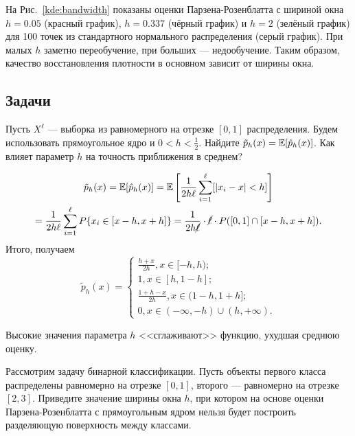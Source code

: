 {На Рис.~\ref{kde:bandwidth} показаны оценки Парзена-Розенблатта с шириной окна
$h=0.05$ (красный график), $h=0.337$ (чёрный график) и $h=2$ (зелёный график)
для 100 точек из стандартного нормального распределения (серый график). При
малых $h$ заметно переобучение, при больших --- недообучение. Таким образом,
качество восстановления плотности в основном зависит от ширины окна.

\newpage
\subsection*{Задачи}

\begin{problem}
Пусть $X^\ell$ --- выборка из равномерного на отрезке $[0,1]$ распределения.
Будем использовать прямоугольное ядро и $0 < h < \frac{1}{2}$. Найдите
$\tilde{p}_h(x) = \mathbb{E}[\hat{p}_h(x)]$. Как влияет параметр $h$ на точность
приближения в среднем?
\end{problem}

\begin{solution}
\begin{multline*}
\tilde{p}_h(x) = \mathbb{E}[\hat{p}_h(x)]
  = \mathbb{E}\left[\frac{1}{2h\ell}\sum_{i = 1}^\ell [|x_i - x| < h]\right]\\
  = \frac{1}{2h\ell}\sum_{i = 1}^\ell P\{x_i \in [x - h, x + h]\}
  = \frac{1}{2h \cancel{\ell}} \cdot \cancel{\ell} \cdot P([0, 1] \cap [x - h, x + h]).
\end{multline*}
Итого, получаем
\begin{equation*}
\tilde{p}_h(x) =
\begin{cases}
\frac{h + x}{2h}, x \in [-h, h);\\
1, x \in [h, 1 - h];\\
\frac{1 + h - x}{2h}, x \in (1 - h, 1 + h];\\
0, x \in (-\infty, -h) \cup (h, +\infty).
\end{cases}
\end{equation*}

Высокие значения параметра $h$ <<сглаживают>> функцию, ухудшая среднюю оценку.
\end{solution}

\begin{problem}
Рассмотрим задачу бинарной классификации. Пусть объекты первого класса
распределены равномерно на отрезке $[0, 1]$, второго --- равномерно на отрезке
$[2, 3]$. Приведите значение ширины окна $h$, при котором на основе оценки
Парзена-Розенблатта с прямоугольным ядром нельзя будет построить разделяющую
поверхность между классами.
\end{problem}

}

